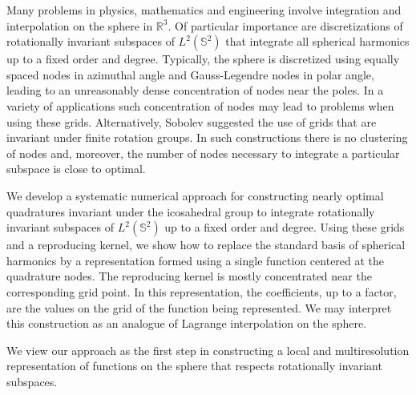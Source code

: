 \documentclass[landscape,a0b,final]{a0poster}
\newenvironment{poster}{
  \begin{center}
  \begin{minipage}[c]{0.98\textwidth}
}{
  \end{minipage} 
  \end{center}
}
\newcommand{\pbox}[4]{
\psshadowbox[#3]{
\begin{minipage}[t][#2][t]{#1}
#4
\end{minipage}
}}
\begin{document}
\begin{poster}
\begin{multicols}{3}
\begin{center}\pbox{0.8\columnwidth}{}{linewidth=2mm,framearc=0.1,linecolor=lightblue,fillstyle=gradient,gradangle=0,gradbegin=white,gradend=whiteblue,gradmidpoint=1.0,framesep=1em}{\begin{center}Introduction\end{center}}\end{center}
\vspace{0.25cm}
Many problems in physics, mathematics and engineering involve integration
and interpolation on the sphere in $\mathbb{R}^{3}$. Of particular
importance are discretizations of rotationally invariant subspaces
of $L^{2}\left(\mathbb{S}^{2}\right)$ that integrate all spherical
harmonics up to a fixed order and degree. Typically, the sphere is discretized using
equally spaced nodes in azimuthal angle and Gauss-Legendre nodes in polar angle,
leading to an unreasonably dense concentration of nodes near the poles. In a variety
of applications such concentration of nodes may lead to problems when using
these grids. Alternatively, Sobolev \cite{SOBOLEV-1962} suggested the use of
grids that are invariant under finite rotation groups. In such constructions
there is no clustering of nodes and, moreover, the number of nodes necessary to
integrate a particular subspace is close to optimal. 

We develop a systematic numerical approach for constructing
nearly optimal quadratures invariant under the icosahedral group to
integrate rotationally invariant subspaces of $L^{2}\left(\mathbb{S}^{2}\right)$
up to a fixed order and degree. Using these grids and a reproducing
kernel, we show how to replace the standard basis of spherical harmonics
by a representation formed using a single function centered at the
quadrature nodes. The reproducing kernel is mostly concentrated near 
the corresponding grid point. In this representation, the 
coefficients, up to a factor, are the values on the grid of the function 
being represented. We may interpret this construction as an analogue of 
Lagrange interpolation on the sphere. 

We view our approach as the first step in constructing a local and
multiresolution representation of functions on the sphere that respects
rotationally invariant subspaces.  


\vspace{0.25cm}
\begin{center}\pbox{0.8\columnwidth}{}{linewidth=2mm,framearc=0.1,linecolor=lightblue,fillstyle=gradient,gradangle=0,gradbegin=white,gradend=whiteblue,gradmidpoint=1.0,framesep=1em}{\begin{center}Preliminaries\end{center}}\end{center}
\vspace{0.25cm}


\end{multicols}
\end{poster}
\end{document}
